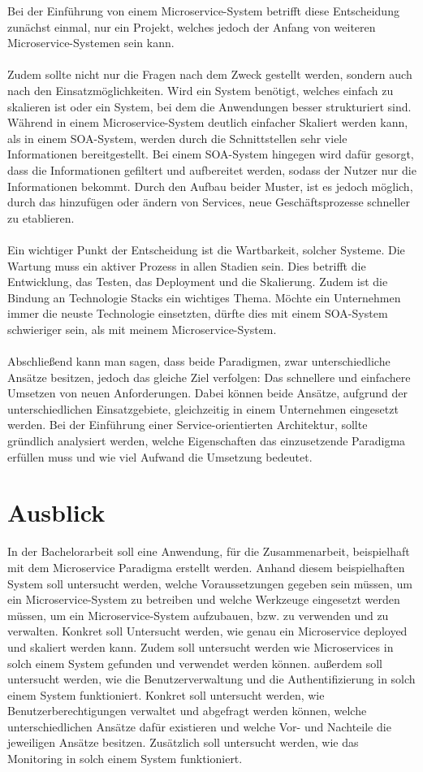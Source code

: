 Bei der Einführung von einem Microservice-System betrifft diese Entscheidung zunächst einmal, nur ein Projekt, welches jedoch der Anfang von weiteren Microservice-Systemen sein kann.
\\\\
Zudem sollte nicht nur die Fragen nach dem Zweck gestellt werden, sondern auch nach den Einsatzmöglichkeiten. Wird ein System benötigt, welches einfach zu skalieren ist oder ein System, bei dem die Anwendungen besser strukturiert sind. Während in einem Microservice-System deutlich einfacher Skaliert werden kann, als in einem SOA-System, werden durch die Schnittstellen sehr viele Informationen bereitgestellt. Bei einem SOA-System hingegen wird dafür gesorgt, dass die Informationen gefiltert und aufbereitet werden, sodass der Nutzer nur die Informationen bekommt. Durch den Aufbau beider Muster, ist es jedoch möglich, durch das hinzufügen oder ändern von Services, neue Geschäftsprozesse schneller zu etablieren.
\\\\
Ein wichtiger Punkt der Entscheidung ist die Wartbarkeit, solcher Systeme. Die Wartung muss ein aktiver Prozess in allen Stadien sein. Dies betrifft die Entwicklung, das Testen, das Deployment und die Skalierung. Zudem ist die Bindung an Technologie Stacks ein wichtiges Thema. Möchte ein Unternehmen immer die neuste Technologie einsetzten, dürfte dies mit einem SOA-System schwieriger sein, als mit meinem Microservice-System.
\\\\
Abschließend kann man sagen, dass beide Paradigmen, zwar unterschiedliche Ansätze besitzen, jedoch das gleiche Ziel verfolgen: Das schnellere und einfachere Umsetzen von neuen Anforderungen. Dabei können beide Ansätze, aufgrund der unterschiedlichen Einsatzgebiete, gleichzeitig in einem Unternehmen eingesetzt werden. Bei der Einführung einer Service-orientierten Architektur, sollte gründlich analysiert werden, welche Eigenschaften das einzusetzende Paradigma erfüllen muss und wie viel Aufwand die Umsetzung bedeutet.

\section{Ausblick}
\label{sec:Ausblick}
In der Bachelorarbeit soll eine Anwendung, für die Zusammenarbeit, beispielhaft mit dem Microservice Paradigma erstellt werden. Anhand diesem beispielhaften System soll untersucht werden, welche Voraussetzungen gegeben sein müssen, um ein Microservice-System zu betreiben und welche Werkzeuge eingesetzt werden müssen, um ein Microservice-System aufzubauen, bzw. zu verwenden und zu verwalten. Konkret soll Untersucht werden, wie genau ein Microservice deployed und skaliert werden kann. Zudem soll untersucht werden wie Microservices in solch einem System gefunden und verwendet werden können. außerdem soll untersucht werden, wie die Benutzerverwaltung und die Authentifizierung in solch einem System funktioniert. Konkret soll untersucht werden, wie Benutzerberechtigungen verwaltet und abgefragt werden können, welche unterschiedlichen Ansätze dafür existieren und welche Vor- und Nachteile die jeweiligen Ansätze besitzen. Zusätzlich soll untersucht werden, wie das Monitoring in solch einem System funktioniert.